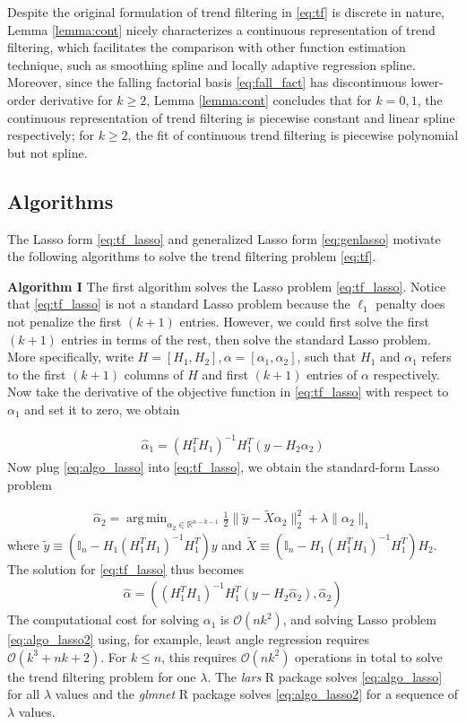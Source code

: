 \documentclass[a4paper]{article}
\DeclareMathOperator*{\argmin}{arg\,min}
\newcommand{\RR}{\mathbb{R}}
\renewcommand{\cal}{\mathcal}
\begin{document}
Despite the original formulation of trend filtering in \eqref{eq:tf} is discrete in nature, Lemma \ref{lemma:cont} nicely characterizes a continuous representation of trend filtering, which facilitates the comparison with other function estimation technique, such as smoothing spline and locally adaptive regression spline. Moreover, since the falling factorial basis \eqref{eq:fall_fact} has discontinuous lower-order derivative for $k\geq 2$, Lemma \ref{lemma:cont} concludes that for $k = 0,1$, the continuous representation of trend filtering is piecewise constant and linear spline respectively; for $k\geq 2$, the fit of continuous trend filtering is piecewise polynomial but not spline.

\subsection{Algorithms}
\label{subsec:algo}
The Lasso form \eqref{eq:tf_lasso} and generalized Lasso form \eqref{eq:genlasso} motivate the following algorithms to solve the trend filtering problem \eqref{eq:tf}. 

\textbf{Algorithm I} The first algorithm solves the Lasso problem \eqref{eq:tf_lasso}. Notice that \eqref{eq:tf_lasso} is not a standard Lasso problem because the $\ell_1$ penalty does not penalize the first $(k+1)$ entries. However, we could first solve the first $(k+1)$ entries in terms of the rest, then solve the standard Lasso problem. More specifically, write $H = [H_1,H_2], \alpha = [\alpha_1, \alpha_2]$, such that $H_1$ and $\alpha_1$ refers to the first $(k+1)$ columns of $H$ and first $(k+1)$ entries of $\alpha$ respectively. Now take the derivative of the objective function in \eqref{eq:tf_lasso} with respect to $\alpha_1$ and set it to zero, we obtain

\begin{align}
\hat{\alpha}_1 = (H_1^TH_1)^{-1}H_1^T(y-H_2\alpha_2) 
\label{eq:algo_lasso}
\end{align}
Now plug \eqref{eq:algo_lasso} into \eqref{eq:tf_lasso}, we obtain the standard-form Lasso problem

\begin{align}
\hat{\alpha}_2 = \argmin_{\alpha_2\in\RR^{n-k-1}} \frac{1}{2}\|\tilde{y} - \tilde{X}\alpha_2\|_2^2 + \lambda\|\alpha_2\|_1
\label{eq:algo_lasso2}
\end{align}
where $\tilde{y} \equiv (\mathbb{I}_n - H_1(H_1^TH_1)^{-1}H_1^T)y$ and $\tilde{X} \equiv (\mathbb{I}_n - H_1(H_1^TH_1)^{-1}H_1^T)H_2$. The solution for \eqref{eq:tf_lasso} thus becomes 
\begin{align}
\hat{\alpha} = ((H_1^TH_1)^{-1}H_1^T(y-H_2\hat{\alpha}_2), \hat{\alpha}_2)
\end{align}
The computational cost for solving $\alpha_1$ is $\cal{O}(nk^2)$, and solving Lasso problem \eqref{eq:algo_lasso2} using, for example, least angle regression\cite{efron2004least} requires $\cal{O}(k^3 + nk+2)$. For $k\leq n$, this requires $\cal{O}(nk^2)$ operations in total to solve the trend filtering problem for one $\lambda$. The \textit{lars} R package solves \eqref{eq:algo_lasso} for all $\lambda$ values and the \textit{glmnet} R package solves \eqref{eq:algo_lasso2} for a sequence of $\lambda$ values.
\end{document}
